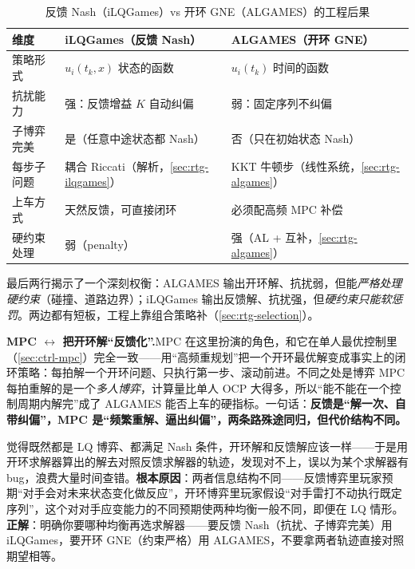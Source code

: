 \begin{table}[H]\centering\small
\caption{反馈 Nash（iLQGames）vs 开环 GNE（ALGAMES）的工程后果}
\label{tab:rtg-ilq-vs-alg-info}
\begin{tabular}{p{} p{} p{}}
\toprule
维度 & iLQGames（反馈 Nash） & ALGAMES（开环 GNE） \\
\midrule
策略形式 & $u_i(t_k,x)$ 状态的函数 & $u_i(t_k)$ 时间的函数 \\
抗扰能力 & 强：反馈增益 $K$ 自动纠偏 & 弱：固定序列不纠偏 \\
子博弈完美 & 是（任意中途状态都 Nash） & 否（只在初始状态 Nash） \\
每步子问题 & 耦合 Riccati（解析，\cref{sec:rtg-ilqgames}） & KKT 牛顿步（线性系统，\cref{sec:rtg-algames}） \\
上车方式 & 天然反馈，可直接闭环 & 必须配高频 MPC 补偿 \\
硬约束处理 & 弱（penalty） & 强（AL + 互补，\cref{sec:rtg-algames}） \\
\bottomrule
\end{tabular}
\end{table}

\noindent 最后两行揭示了一个深刻权衡：ALGAMES 输出开环解、抗扰弱，但能\emph{严格处理硬约束}（碰撞、道路边界）；iLQGames 输出反馈解、抗扰强，但\emph{硬约束只能软惩罚}。两边都有短板，工程上靠组合策略补（\cref{sec:rtg-selection}）。

\begin{insight}
\textbf{MPC $\leftrightarrow$ 把开环解“反馈化”.}\;MPC 在这里扮演的角色，和它在单人最优控制里（\cref{sec:ctrl-mpc}）完全一致——用“高频重规划”把一个开环最优解变成事实上的闭环策略：每拍解一个开环问题、只执行第一步、滚动前进。不同之处是博弈 MPC 每拍重解的是一个\emph{多人博弈}，计算量比单人 OCP 大得多，所以“能不能在一个控制周期内解完”成了 ALGAMES 能否上车的硬指标。一句话：\textbf{反馈是“解一次、自带纠偏”，MPC 是“频繁重解、逼出纠偏”，两条路殊途同归，但代价结构不同。}
\end{insight}

\begin{pitfall}
觉得既然都是 LQ 博弈、都满足 Nash 条件，开环解和反馈解应该一样——于是用开环求解器算出的解去对照反馈求解器的轨迹，发现对不上，误以为某个求解器有 bug，浪费大量时间查错。\textbf{根本原因}：两者信息结构不同——反馈博弈里玩家预期“对手会对未来状态变化做反应”，开环博弈里玩家假设“对手雷打不动执行既定序列”，这个对对手应变能力的不同预期使两种均衡一般不同，即便在 LQ 情形。\textbf{正解}：明确你要哪种均衡再选求解器——要反馈 Nash（抗扰、子博弈完美）用 iLQGames，要开环 GNE（约束严格）用 ALGAMES，不要拿两者轨迹直接对照期望相等。
\end{pitfall}

